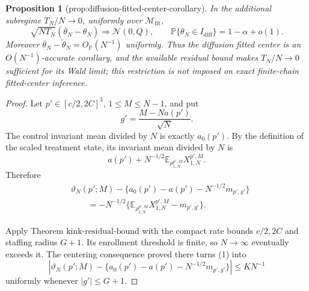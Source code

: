 \documentclass{article}
\newtheorem{proposition}{Proposition}
\begin{document}
\begin{proposition}[prop:diffusion-fitted-center-corollary]\label{prop:diffusion-fitted-center-corollary}
In the additional subregime \(T_N/N\to0\), uniformly over \(\mathcal M_{\mathrm{fit}}\),
\[
 \sqrt{NT_N}(\overline\theta_N-\theta_N)\Rightarrow\mathcal N(0,Q),
 \qquad
 \mathbb P\{\theta_N\in I_{\mathrm{diff}}\}=1-\alpha+o(1).
\]
Moreover \(\overline\theta_N-\widetilde\theta_N=O_{\mathbb P}(N^{-1})\) uniformly.  Thus the diffusion fitted center is an \(O(N^{-1})\)-accurate corollary, and the available residual bound makes \(T_N/N\to0\) sufficient for its Wald limit; this restriction is not imposed on exact finite-chain fitted-center inference.
\end{proposition}
\begin{proof}
Let \(p'\in[c/2,2C]^3\), \(1\leq M\leq N-1\), and put
\[
 g'=\frac{M-Na(p')}{\sqrt N}.
\]
The control invariant mean divided by \(N\) is exactly \(a_0(p')\).  By the definition of the scaled treatment state, its invariant mean divided by \(N\) is
\[
 a(p')+N^{-1/2}\mathbb E_{\rho_{1,N}^{p',M}}X_{1,N}^{p',M}.
\]
Therefore
\[
 \begin{split}
 &\vartheta_N(p';M)-
 \{a_0(p')-a(p')-N^{-1/2}m_{p',g'}\}\\
 &\qquad=-N^{-1/2}
 \{\mathbb E_{\rho_{1,N}^{p',M}}X_{1,N}^{p',M}-m_{p',g'}\}. \tag{1}
 \end{split}
\]

Apply Theorem \(\mathrm{kink\mbox{-}residual\mbox{-}bound}\) with the compact rate bounds \(c/2,2C\) and staffing radius \(G+1\).  Its enrollment threshold is finite, so \(N\to\infty\) eventually exceeds it.  The centering consequence proved there turns (1) into
\[
 \left|\vartheta_N(p';M)-
 \{a_0(p')-a(p')-N^{-1/2}m_{p',g'}\}\right|
 \leq K N^{-1}                                                \tag{2}
\]
uniformly whenever \(|g'|\leq G+1\).


\end{proof}
\end{document}

